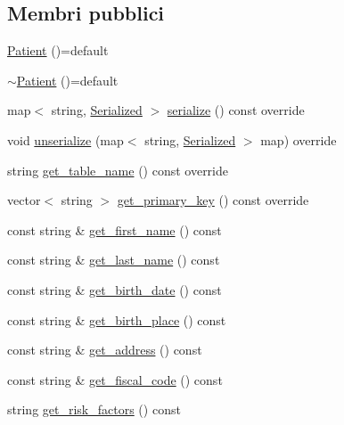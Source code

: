 \subsection*{Membri pubblici}
\begin{DoxyCompactItemize}
\item 
\mbox{\hyperlink{classmm_1_1model_1_1_patient_ad15758bdb4995cf5f0b2830eef2b4b43}{Patient}} ()=default
\item 
\mbox{\hyperlink{classmm_1_1model_1_1_patient_ad9b2919b2efa8f1e7f6d405757d73ccb}{$\sim$\+Patient}} ()=default
\item 
map$<$ string, \mbox{\hyperlink{structmm_1_1_serialized}{Serialized}} $>$ \mbox{\hyperlink{classmm_1_1model_1_1_patient_ae3ac219cd109e8c53daaf9b2758c3a0e}{serialize}} () const override
\item 
void \mbox{\hyperlink{classmm_1_1model_1_1_patient_a7e1d8cbfc2cdd653281dce87497c6065}{unserialize}} (map$<$ string, \mbox{\hyperlink{structmm_1_1_serialized}{Serialized}} $>$ map) override
\item 
string \mbox{\hyperlink{classmm_1_1model_1_1_patient_abe79da3e4fabd80e039ae4880dfa76cb}{get\+\_\+table\+\_\+name}} () const override
\item 
vector$<$ string $>$ \mbox{\hyperlink{classmm_1_1model_1_1_patient_ae85640f3cb3d34bb57e1129ef46a0cbf}{get\+\_\+primary\+\_\+key}} () const override
\item 
const string \& \mbox{\hyperlink{classmm_1_1model_1_1_patient_a3661b2666d368492511ed3bad79c0389}{get\+\_\+first\+\_\+name}} () const
\item 
const string \& \mbox{\hyperlink{classmm_1_1model_1_1_patient_a88c0051957b5a6f172cdc35432505923}{get\+\_\+last\+\_\+name}} () const
\item 
const string \& \mbox{\hyperlink{classmm_1_1model_1_1_patient_ac54b024c619d6f31c72766a01bc5d0ee}{get\+\_\+birth\+\_\+date}} () const
\item 
const string \& \mbox{\hyperlink{classmm_1_1model_1_1_patient_a4e4770a79fef23b54026e013586e61fa}{get\+\_\+birth\+\_\+place}} () const
\item 
const string \& \mbox{\hyperlink{classmm_1_1model_1_1_patient_a0db04bf2c2ae5b9eb6417f4b6e74a84a}{get\+\_\+address}} () const
\item 
const string \& \mbox{\hyperlink{classmm_1_1model_1_1_patient_a29590c6ce9d2b19dbdff3330ee5e4523}{get\+\_\+fiscal\+\_\+code}} () const
\item 
string \mbox{\hyperlink{classmm_1_1model_1_1_patient_a7ab70bc4aafc95f687c29d02ac398e06}{get\+\_\+risk\+\_\+factors}} () const

\end{DoxyCompactItemize}
